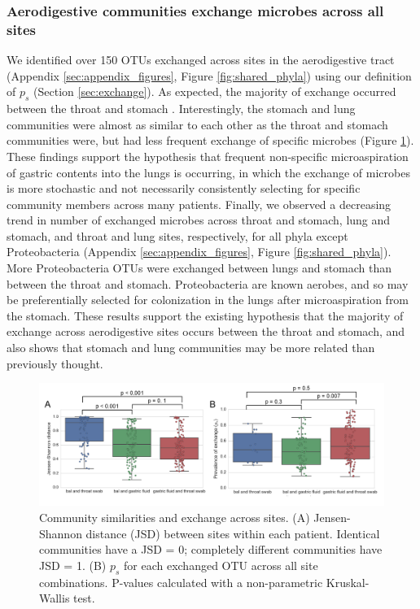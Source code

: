 \documentclass[12pt]{article}
\begin{document}
\subsubsection{Aerodigestive communities exchange microbes across all sites}

We identified over 150 OTUs exchanged across sites in the aerodigestive tract 
(Appendix \ref{sec:appendix_figures}, Figure \ref{fig:shared_phyla})
using our definition of $p_s$ (Section \ref{sec:exchange}).
As expected, the majority of exchange occurred between the throat and stomach \cite{bassis-source-2015}.
Interestingly, the stomach and lung communities were almost as similar to
each other as the throat and stomach communities were,
but had less frequent exchange of specific microbes (Figure \ref{fig:similarities}). 
These findings support the hypothesis that frequent non-specific microaspiration
of gastric contents into the lungs is occurring,
in which the exchange of microbes is more stochastic and
not necessarily consistently selecting for specific community members across many patients.
Finally, we observed a decreasing trend in number of exchanged microbes 
across throat and stomach, lung and stomach, and throat and lung sites, respectively, 
for all phyla except Proteobacteria (Appendix \ref{sec:appendix_figures}, Figure \ref{fig:shared_phyla}). 
More Proteobacteria OTUs were exchanged 
between lungs and stomach than between the throat and stomach. Proteobacteria are 
known aerobes, and so may be preferentially selected for colonization in 
the lungs after microaspiration from the stomach.
These results support the existing hypothesis that the majority of
exchange across aerodigestive sites occurs between the throat and stomach, and
also shows that stomach and lung communities may be more related than previously
thought.

\begin{figure}[h]
\begin{center}
	\includegraphics[scale=0.6]{all_jsd_sharedness}
	\caption{Community similarities and exchange across sites.
	(A) Jensen-Shannon distance (JSD) between sites within each patient. 
	Identical communities have a JSD = 0; completely different
	communities have JSD = 1. (B) $p_s$ for each exchanged OTU across 
	all site combinations. P-values calculated with a
	non-parametric Kruskal-Wallis test.}
	\label{fig:similarities}
\end{center}
\end{figure}
\end{document}
